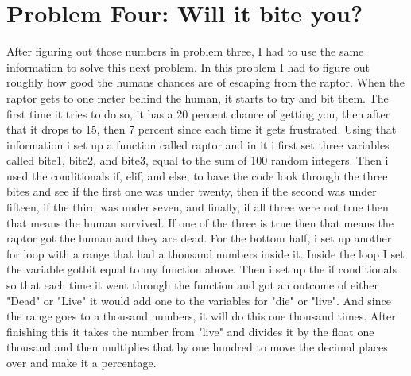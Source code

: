 \documentclass[twocolumn]{revtex4}
\begin{document}
\section{Problem Four: Will it bite you?}
	After figuring out those numbers in problem three, I had to use the same information to solve this next problem. In this problem I had to figure out roughly how good the humans chances are of escaping from the raptor. When the raptor gets to one meter behind the human, it starts to try and bit them. The first time it tries to do so, it has a 20 percent chance of getting you, then after that it drops to 15, then 7 percent since each time it gets frustrated. Using that information i set up a function called raptor and in it i first set three variables called bite1, bite2, and bite3, equal to the sum of 100 random integers. Then i used the conditionals if, elif, and else, to have the code look through the three bites and see if the first one was under twenty, then if the second was under fifteen, if the third was under seven, and finally, if all three were not true then that means the human survived. If one of the three is true then that means the raptor got the human and they are dead. For the bottom half, i set up another for loop with a range that had a thousand numbers inside it. Inside the loop I set the variable gotbit equal to my function above. Then i set up the if conditionals so that each time it went through the function and got an outcome of either "Dead" or "Live" it would add one to the variables for "die" or "live". And since the range goes to a thousand numbers, it will do this one thousand times. After finishing this it takes the number from "live" and divides it by the float one thousand and then multiplies that by one hundred to move the decimal places over and make it a percentage. 
	
\end{document}
